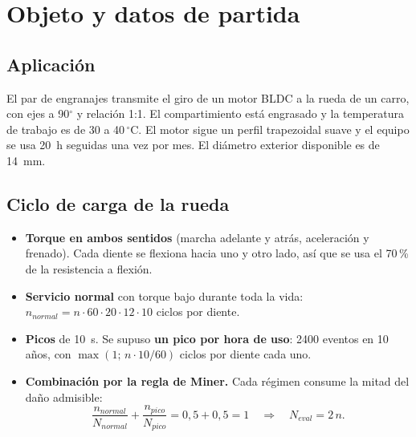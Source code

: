 \documentclass[11pt,a4paper]{article}
\begin{document}
\tableofcontents
\newpage

\section{Objeto y datos de partida}
\subsection{Aplicación}
El par de engranajes transmite el giro de un motor BLDC a la rueda de un carro, con ejes a 90$^\circ$ y relación 1:1.
El compartimiento está engrasado y la temperatura de trabajo es de 30 a 40\,$^\circ$C. El motor sigue un perfil
trapezoidal suave y el equipo se usa 20~h seguidas una vez por mes. El diámetro exterior disponible es de 14~mm.

\subsection{Ciclo de carga de la rueda}
\begin{itemize}
\item \textbf{Torque en ambos sentidos} (marcha adelante y atrás, aceleración y frenado). Cada diente se flexiona hacia uno y otro lado,
así que se usa el 70\,\% de la resistencia a flexión.
\item \textbf{Servicio normal} con torque bajo durante toda la vida: $n_{normal}=n\cdot60\cdot20\cdot12\cdot10$ ciclos por diente.
\item \textbf{Picos} de 10~s. Se supuso \textbf{un pico por hora de uso}: 2400 eventos en 10 años, con $\max(1;\,n\cdot10/60)$ ciclos por diente cada uno.
\item \textbf{Combinación por la regla de Miner.} Cada régimen consume la mitad del daño admisible:
\begin{equation}
\frac{n_{normal}}{N_{normal}}+\frac{n_{pico}}{N_{pico}}=0{,}5+0{,}5=1
\quad\Rightarrow\quad N_{eval}=2\,n .
\end{equation}
\end{itemize}
\end{document}
